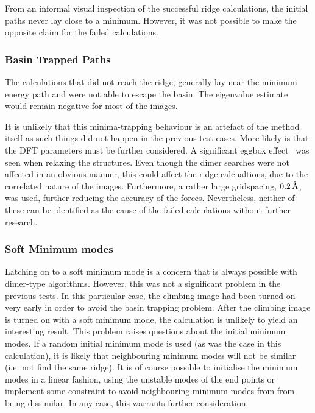 From an informal visual inspection of the successful ridge calculations, the initial paths never lay close to a minimum.
However, it was not possible to make the opposite claim for the failed calculations.

\subsubsection{Basin Trapped Paths}
The calculations that did not reach the ridge, generally lay near the minimum energy path and were not able to escape the basin.
The eigenvalue estimate would remain negative for most of the images.

It is unlikely that this minima-trapping behaviour is an artefact of the method itself as such things did not happen in the previous test cases.
More likely is that the DFT parameters must be further considered.
A significant eggbox effect~\cite{gpaw-2005} was seen when relaxing the structures.
Even though the dimer searches were not affected in an obvious manner, this could affect the ridge calcualtions, due to the correlated nature of the images.
Furthermore, a rather large gridspacing, $0.2 \, \mathrm{\mathring{\mathrm{A}}}$, was used, further reducing the accuracy of the forces.
Nevertheless, neither of these can be identified as the cause of the failed calculations without further research.

\subsubsection{Soft Minimum modes}
Latching on to a soft minimum mode is a concern that is always possible with dimer-type algorithms.
However, this was not a significant problem in the previous tests.
In this particular case, the climbing image had been turned on very early in order to avoid the basin trapping problem.
After the climbing image is turned on with a soft minimum mode, the calculation is unlikely to yield an interesting result.
This problem raises questions about the initial minimum modes.
If a random initial minimum mode is used (as was the case in this calculation), it is likely that neighbouring minimum modes will not be similar (i.e. not find the same ridge).
It is of course possible to initialise the minimum modes in a linear fashion, using the unstable modes of the end points or implement some constraint to avoid neighbouring minimum modes from from being dissimilar.
In any case, this warrants further consideration.

